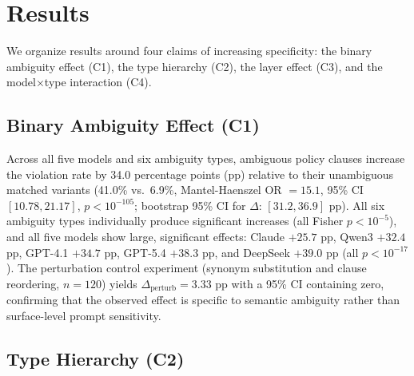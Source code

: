 \section{Results}
\label{sec:results}

We organize results around four claims of increasing specificity: the binary ambiguity effect (C1), the type hierarchy (C2), the layer effect (C3), and the model$\times$type interaction (C4).

\subsection{Binary Ambiguity Effect (C1)}

Across all five models and six ambiguity types, ambiguous policy clauses increase the violation rate by 34.0 percentage points (pp) relative to their unambiguous matched variants (41.0\% vs.\ 6.9\%, Mantel-Haenszel OR $= 15.1$, 95\% CI $[10.78, 21.17]$, $p < 10^{-105}$; bootstrap 95\% CI for $\Delta$: $[31.2, 36.9]$ pp). All six ambiguity types individually produce significant increases (all Fisher $p < 10^{-5}$), and all five models show large, significant effects: Claude $+25.7$ pp, Qwen3 $+32.4$ pp, GPT-4.1 $+34.7$ pp, GPT-5.4 $+38.3$ pp, and DeepSeek $+39.0$ pp (all $p < 10^{-17}$). The perturbation control experiment (synonym substitution and clause reordering, $n = 120$) yields $\Delta_{\text{perturb}} = 3.33$ pp with a 95\% CI containing zero, confirming that the observed effect is specific to semantic ambiguity rather than surface-level prompt sensitivity.

\subsection{Type Hierarchy (C2)}

